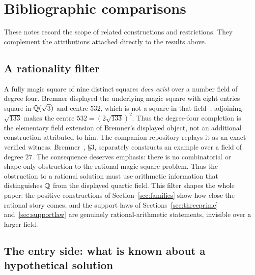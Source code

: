 \section{Bibliographic comparisons}\label{app:literature}

These notes record the scope of related constructions and restrictions.
They complement the attributions attached directly to the results above.


\subsection{A rationality filter}

A fully magic square of nine distinct squares \emph{does exist} over a
number field of degree four. Bremner displayed the underlying magic square
with eight entries square in $\mathbb{Q}(\sqrt3)$ and centre $532$, which is not a
square in that field~\cite{BRE01}; adjoining $\sqrt{133}$ makes the centre
$532=(2\sqrt{133})^{2}$. Thus the degree-four completion is the elementary
field extension of Bremner's displayed object, not an additional
construction attributed to him. The companion repository replays it as an
exact verified witness. Bremner~\cite{BRE99},
\S3, separately constructs an example over a field of degree $27$. The
consequence deserves emphasis: there is no
combinatorial or shape-only obstruction to the rational magic-square problem. Thus the obstruction to a rational solution must use arithmetic
information that distinguishes $\mathbb{Q}$ from the displayed quartic field.
This filter shapes the whole paper: the positive constructions of
Section~\ref{sec:families} show how close the rational story comes, and the
support laws of Sections~\ref{sec:threeprime} and~\ref{sec:supportlaw} are
genuinely rational-arithmetic statements, invisible over a larger field.

\subsection{The entry side: what is known about a hypothetical solution}

